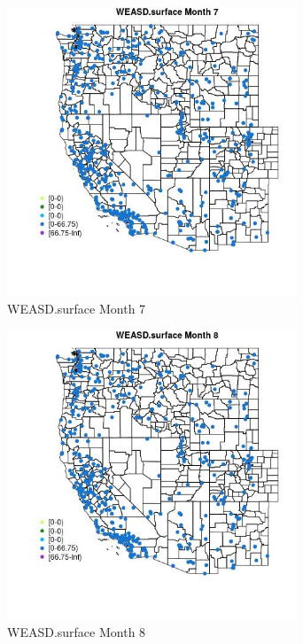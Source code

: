 \begin{figure} 
\centering  
\includegraphics[width=0.77\textwidth]{Code_Outputs/Report_ML_input_PM25_Step4_part_e_de_duplicated_aves_compiled_2019-05-14wNAs_MapObsMo7WEASDsurface.jpg} 
\caption{\label{fig:Report_ML_input_PM25_Step4_part_e_de_duplicated_aves_compiled_2019-05-14wNAsMapObsMo7WEASDsurface}WEASD.surface Month 7} 
\end{figure} 
 

\clearpage 

\begin{figure} 
\centering  
\includegraphics[width=0.77\textwidth]{Code_Outputs/Report_ML_input_PM25_Step4_part_e_de_duplicated_aves_compiled_2019-05-14wNAs_MapObsMo8WEASDsurface.jpg} 
\caption{\label{fig:Report_ML_input_PM25_Step4_part_e_de_duplicated_aves_compiled_2019-05-14wNAsMapObsMo8WEASDsurface}WEASD.surface Month 8} 
\end{figure} 
 

